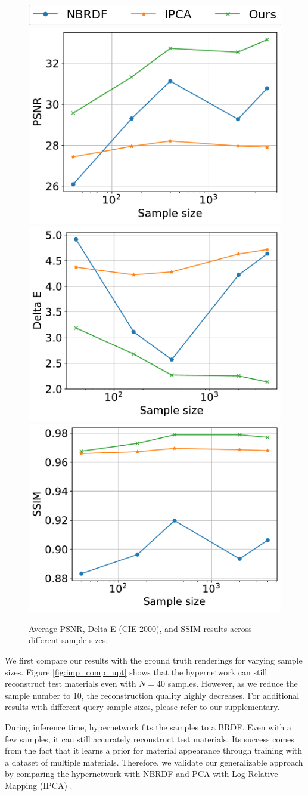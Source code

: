 \begin{figure}[t]
  \centering
    {\includegraphics[width=0.35\linewidth]{Chapters/hyperbrdf-figs/legend.png}}\\
  {\includegraphics[width=0.32\linewidth]{Chapters/hyperbrdf-figs/PSNR.pdf}}
  {\includegraphics[width=0.32\linewidth]{Chapters/hyperbrdf-figs/DeltaE.pdf}}
    {\includegraphics[width=0.32\linewidth]{Chapters/hyperbrdf-figs/SSIM.pdf}}
   \caption{Average PSNR, Delta E (CIE 2000), and SSIM results across different sample sizes. }
   \label{fig:imp_plots}
\end{figure}



We first compare our results with the ground truth renderings for varying sample sizes. Figure \ref{fig:imp_comp_upt} shows that the hypernetwork can still reconstruct test materials even with $N = 40$ samples. However, as we reduce the sample number to 10, the reconstruction quality highly decreases. For additional results with different query sample sizes, please refer to our supplementary.


During inference time, hypernetwork fits the samples to a BRDF. Even with a few samples, it can still accurately reconstruct test materials. Its success comes from the fact that it learns a prior for material appearance through training with a dataset of multiple materials. Therefore, we validate our generalizable approach by comparing the hypernetwork with NBRDF \cite{sztrajman2021neural} and PCA with Log Relative Mapping (IPCA) \cite{nielsen2015optimal}.


